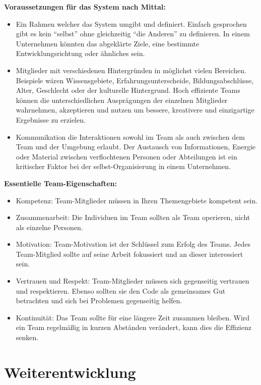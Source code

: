 \textbf{Voraussetzungen für das System nach Mittal:}\cite{Mittal2013}
\begin{itemize}
	\item Ein Rahmen welcher das System umgibt und definiert. Einfach gesprochen gibt es kein "`selbst"' ohne gleichzeitig "`die Anderen"' zu definieren. In einem Unternehmen könnten das abgeklärte Ziele, eine bestimmte Entwicklungsrichtung oder ähnliches sein.
	\item Mitglieder mit verschiedenen Hintergründen in möglichst vielen Bereichen. Beispiele wären Wissensgebiete, Erfahrungsunterscheide, Bildungsabschlüsse, Alter, Geschlecht oder der kulturelle Hintergrund. Hoch effiziente Teams können die unterschiedlichen Ausprägungen der einzelnen Mitglieder wahrnehmen, akzeptieren und nutzen um bessere, kreativere und einzigartige Ergebnisse zu erzielen.
	\item Kommunikation die Interaktionen sowohl im Team als auch zwischen dem Team und der Umgebung erlaubt. Der Austausch von Informationen, Energie oder Material zwischen verflochtenen Personen oder Abteilungen ist ein kritischer Faktor bei der selbst-Organisierung in einem Unternehmen.
\end{itemize}

\textbf{Essentielle Team-Eigenschaften:}\cite{Mittal2013}
\begin{itemize}
	\item Kompetenz: Team-Mitglieder müssen in Ihren Themengebiete kompetent sein.
	\item Zusammenarbeit: Die Individuen im Team sollten als Team operieren, nicht als einzelne Personen.
	\item Motivation: Team-Motivation ist der Schlüssel zum Erfolg des Teams. Jedes Team-Mitglied sollte auf seine Arbeit fokussiert und an dieser interessiert sein.
	\item Vertrauen und Respekt: Team-Mitglieder müssen sich gegenseitig vertrauen und respektieren. Ebenso sollten sie den Code als gemeinsames Gut betrachten und sich bei Problemen gegenseitig helfen.
	\item Kontinuität: Das Team sollte für eine längere Zeit zusammen bleiben. Wird ein Team regelmäßig in kurzen Abständen verändert, kann dies die Effizienz senken. 
\end{itemize}

\section{Weiterentwicklung}

